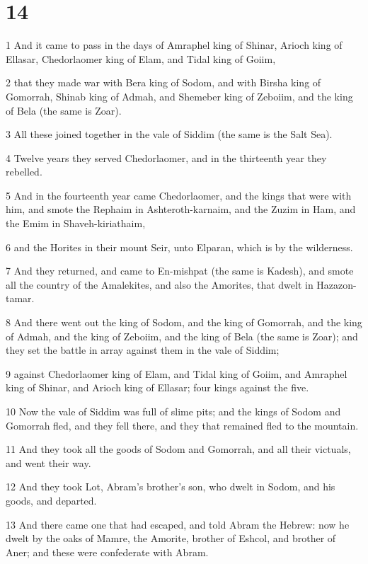 \chapter{14}

\par 1 And it came to pass in the days of Amraphel king of Shinar, Arioch king of Ellasar, Chedorlaomer king of Elam, and Tidal king of Goiim,
\par 2 that they made war with Bera king of Sodom, and with Birsha king of Gomorrah, Shinab king of Admah, and Shemeber king of Zeboiim, and the king of Bela (the same is Zoar).
\par 3 All these joined together in the vale of Siddim (the same is the Salt Sea).
\par 4 Twelve years they served Chedorlaomer, and in the thirteenth year they rebelled.
\par 5 And in the fourteenth year came Chedorlaomer, and the kings that were with him, and smote the Rephaim in Ashteroth-karnaim, and the Zuzim in Ham, and the Emim in Shaveh-kiriathaim,
\par 6 and the Horites in their mount Seir, unto Elparan, which is by the wilderness.
\par 7 And they returned, and came to En-mishpat (the same is Kadesh), and smote all the country of the Amalekites, and also the Amorites, that dwelt in Hazazon-tamar.
\par 8 And there went out the king of Sodom, and the king of Gomorrah, and the king of Admah, and the king of Zeboiim, and the king of Bela (the same is Zoar); and they set the battle in array against them in the vale of Siddim;
\par 9 against Chedorlaomer king of Elam, and Tidal king of Goiim, and Amraphel king of Shinar, and Arioch king of Ellasar; four kings against the five.
\par 10 Now the vale of Siddim was full of slime pits; and the kings of Sodom and Gomorrah fled, and they fell there, and they that remained fled to the mountain.
\par 11 And they took all the goods of Sodom and Gomorrah, and all their victuals, and went their way.
\par 12 And they took Lot, Abram's brother's son, who dwelt in Sodom, and his goods, and departed.
\par 13 And there came one that had escaped, and told Abram the Hebrew: now he dwelt by the oaks of Mamre, the Amorite, brother of Eshcol, and brother of Aner; and these were confederate with Abram.
